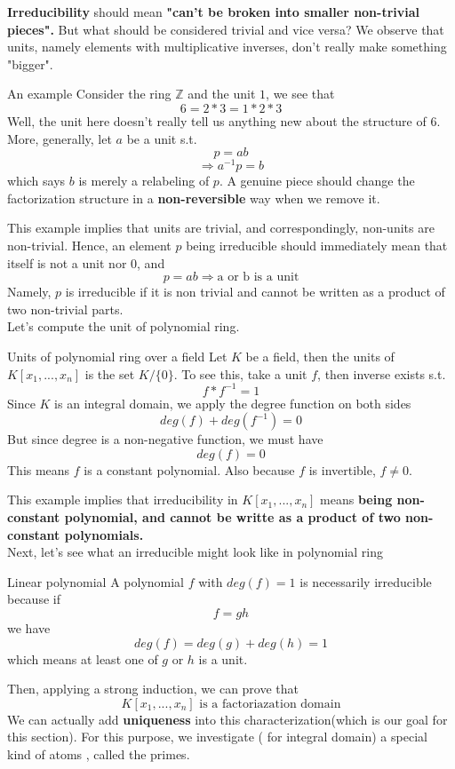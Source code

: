 \documentclass[11pt]{article}
\begin{document}
\textbf{Irreducibility} should mean  \textbf{"can't be broken into smaller non-trivial pieces".}  But what should be considered trivial and vice versa? We observe that units, namely elements with multiplicative inverses, don't really make something "bigger". 
\begin{mybox}{An example}
Consider the ring $\mathbb{Z}$ and the unit $1$, we see that 
$$
6=2*3=1*2*3
$$
Well, the unit here doesn't really tell us anything new about the structure of $6$. More, generally, let $a$ be a unit s.t. 
$$
p=ab
$$
$$
\Rightarrow a^{-1}p=b
$$
which says $b$ is merely a relabeling of $p$.  A genuine piece should change the factorization structure in a \textbf{non-reversible} way when we remove it.
\end{mybox}

This example implies that units are trivial, and correspondingly, non-units are non-trivial. Hence, an element $p$ being irreducible  should immediately mean that itself is not a unit nor $0$, and 
$$
p=ab\Rightarrow \text{a or b is a unit}
$$
Namely,  $p$ is irreducible if it is non trivial and cannot be written as a product of two non-trivial parts.\\

Let's compute the unit of polynomial ring. 
\begin{mybox}{Units of polynomial ring over a field}
Let $K$ be a field, then the units of $K[x_1,...,x_n]$ is the set $K/\{0\}$. To see this, take a unit $f$, then inverse exists s.t.
$$
f*f^{-1}=1
$$
Since $K$ is an integral domain, we apply the degree function on both sides
$$
deg(f)+deg(f^{-1})=0
$$
But since degree is a non-negative function, we must have 
$$
deg(f)=0
$$
This means $f$ is a constant polynomial.  Also because $f$ is invertible, $f\neq 0$.  
\end{mybox}
This example implies that irreducibility in $K[x_1,...,x_n]$ means \textbf{being non-constant polynomial, and cannot be writte as a product of two non-constant polynomials.}\\

Next, let's see what an irreducible might look like in polynomial ring

\begin{mybox}{Linear polynomial}
A polynomial $f$ with $deg(f)=1$ is necessarily irreducible because if 
$$
f=gh
$$
we have 
$$
deg(f)=deg(g)+deg(h)=1
$$
which means at least one of $g$ or $h$ is a unit. 
\end{mybox}
Then, applying a strong induction, we can prove that 
$$
K[x_1,...,x_n] \text{ is a factoriazation domain}
$$
We can actually add \textbf{uniqueness } into this characterization(which is our goal for this section). For this purpose, we investigate ( for integral domain) a special kind of atoms , called the primes. \\
\end{document}
